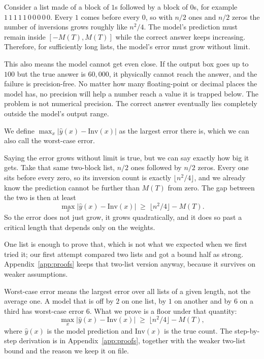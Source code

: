 \documentclass[10pt]{article}
\theoremstyle{definition}
\newcommand{\Inv}{\mathrm{Inv}}
\begin{document}
Consider a list made of a block of $1$s followed by a block of $0$s, for
example $1\,1\,1\,1\,1\,0\,0\,0\,0\,0$. Every $1$ comes before every $0$,
so with $n/2$ ones and $n/2$ zeros the number of inversions grows roughly
like $n^2/4$. The model's prediction must remain inside $[-M(T), M(T)]$
while the correct answer keeps increasing. Therefore, for sufficiently
long lists, the model's error must grow without limit.

This also means the model cannot get even close. If the output box goes up
to $100$ but the true answer is $60{,}000$, it physically cannot reach the
answer, and the failure is precision-free. No matter how many floating-point
or decimal places the model has, no precision will help a number reach a
value it is trapped below. The problem is not numerical precision. The
correct answer eventually lies completely outside the model's output
range.

We define $\max_x |\hat{y}(x) - \Inv(x)|$ as the largest error there is,
which we can also call the worst-case error.

Saying the error grows without limit is true, but we can say exactly how
big it gets. Take that
same two-block list, $n/2$ ones followed by $n/2$ zeros. Every one sits
before every zero, so its inversion count is exactly $\lfloor n^2/4
\rfloor$, and we already know the prediction cannot be further than $M(T)$
from zero. The gap between the two is then at least
\[
  \max_x |\hat{y}(x) - \Inv(x)| \;\ge\; \lfloor n^2/4 \rfloor - M(T).
\]
So the error does not just grow, it grows quadratically, and it does so
past a critical length that depends only on the weights.

One list is enough to prove that, which is not what we expected when we
first tried it; our first attempt compared two lists and got a bound half
as strong. Appendix~\ref{app:proofs} keeps that two-list version anyway,
because it survives on weaker assumptions.



\noindent Worst-case error means the largest error over all lists of a
given length, not the average one. A model that is off by $2$ on one list,
by $1$ on another and by $6$ on a third has worst-case error $6$. What we
prove is a floor under that quantity:
\begin{equation}
\max_x \big|\hat{y}(x) - \Inv(x)\big| \;\geq\; \lfloor n^2/4 \rfloor - M(T),
\label{eq:worstcase}
\end{equation}
where $\hat{y}(x)$ is the model prediction and $\Inv(x)$ is the true
count. The step-by-step derivation is in Appendix~\ref{app:proofs},
together with the weaker two-list bound and the reason we keep it on file.
\end{document}
